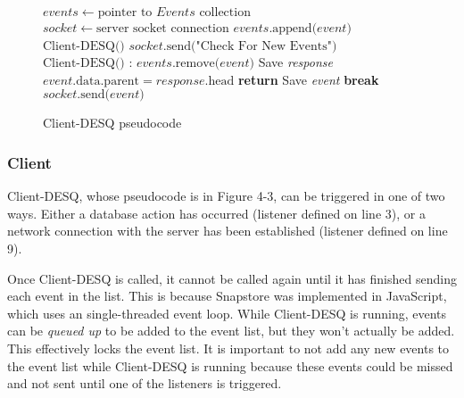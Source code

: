 \begin{center}
\begin{figure}[ht]
\begin{algorithmic}[1]
\State $events \gets \text{pointer to }Events \text{ collection}$
\State $socket \gets \text{server socket connection}$
\State $events\text{.append(}event\text{)}$
\EndWhile
\EndFunction
{}
\State $\text{Client-DESQ()}$
\EndWhile
\EndFunction
{}
\State $socket\text{.send("Check For New Events")}$
\State $\text{Client-DESQ()}$
\EndWhile
\EndFunction
{}
:
\State $events\text{.remove(}event\text{)}$
 
\State Save \emph{response} 
\State $event\text{.data.parent} = response\text{.head}$
\EndIf
\Else {}
\State \textbf{return}
\EndIf
\State Save \emph{event}
\EndIf
\EndWhile
\EndFunction
{}
\State \textbf{break}
\EndIf
\State $socket\text{.send(}event\text{)}$
\EndFor
\EndProcedure
\end{algorithmic}
\caption{Client-DESQ pseudocode}\label{euclid}
\end{figure}
\end{center}

\subsubsection{Client}

Client-DESQ, whose pseudocode is in Figure 4-3, can be triggered in one of two ways. Either a database action has occurred (listener defined on line 3), or a network connection with the server has been established (listener defined on line 9). 

Once Client-DESQ is called, it cannot be called again until it has finished sending each event in the list. This is because Snapstore was implemented in JavaScript, which uses an single-threaded event loop. While Client-DESQ is running, events can be \textit{queued up} to be added to the event list, but they won't actually be added. This effectively locks the event list. It is important to not add any new events to the event list while Client-DESQ is running because these events could be missed and not sent until one of the listeners is triggered.


